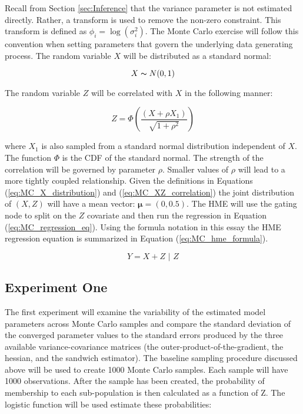\documentclass[12pt]{article}
\theoremstyle{definition}
\begin{document}
Recall from Section \ref{sec:Inference} that the variance parameter is not estimated directly. Rather, a transform is used to remove the non-zero constraint. This transform is defined as $\phi_{i} = \log(\sigma^{2}_{i})$. The Monte Carlo exercise will follow this convention when setting parameters that govern the underlying data generating process. The random variable $X$ will be distributed as a standard normal:

\begin{equation} \label{eq:MC_X_distribution}
    X \thicksim N(0, 1)
\end{equation}

The random variable $Z$ will be correlated with $X$ in the following manner:

\begin{equation} \label{eq:MC_XZ_correlation}
    Z = \Phi \left( \frac{(X + \rho X_{1})}{\sqrt{1 + \rho^{2}}} \right)
\end{equation}

where $X_{1}$ is also sampled from a standard normal distribution independent of $X$. The function $\Phi$ is the CDF of the standard normal. The strength of the correlation will be governed by parameter $\rho$. Smaller values of $\rho$ will lead to a more tightly coupled relationship. Given the definitions in Equations (\ref{eq:MC_X_distribution}) and (\ref{eq:MC_XZ_correlation}) the joint distribution of $(X, Z)$ will have a mean vector: $\boldsymbol{\mu} = (0, 0.5)$. The HME will use the gating node to split on the $Z$ covariate and then run the regression in Equation (\ref{eq:MC_regression_eq}). Using the formula notation in this essay the HME regression equation is summarized in Equation (\ref{eq:MC_hme_formula}).

\begin{equation} \label{eq:MC_hme_formula}
    Y = X + Z \,\,|\,\, Z
\end{equation}

\subsection{Experiment One}



The first experiment will examine the variability of the estimated model parameters across Monte Carlo samples and compare the standard deviation of the converged parameter values to the standard errors produced by the three available variance-covariance matrices (the outer-product-of-the-gradient, the hessian, and the sandwich estimator). The baseline sampling procedure discussed above will be used to create 1000 Monte Carlo samples. Each sample will have 1000 observations. After the sample has been created, the probability of membership to each sub-population is then calculated as a function of Z. The logistic function will be used estimate these probabilities:
\end{document}
